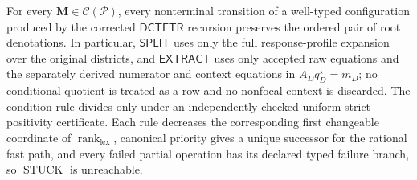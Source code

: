 For every \(\mathbf M\in\mathcal C(\mathcal P)\), every nonterminal transition of a well-typed configuration produced by the corrected \(\mathsf{DCTFTR}\) recursion preserves the ordered pair of root denotations.  In particular, \(\mathsf{SPLIT}\) uses only the full response-profile expansion over the original districts, and \(\mathsf{EXTRACT}\) uses only accepted raw equations and the separately derived numerator and context equations in \(A_Dq_D^\star=m_D\); no conditional quotient is treated as a row and no nonfocal context is discarded.  The condition rule divides only under an independently checked uniform strict-positivity certificate.  Each rule decreases the corresponding first changeable coordinate of \(\operatorname{rank}_{\mathrm{lex}}\), canonical priority gives a unique successor for the rational fast path, and every failed partial operation has its declared typed failure branch, so \(\operatorname{STUCK}\) is unreachable.